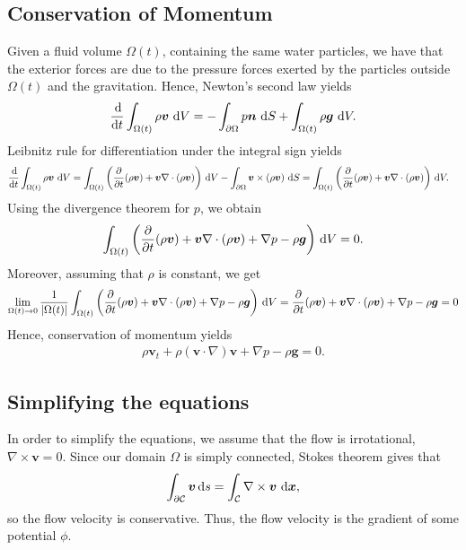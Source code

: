 \documentclass[11pt]{article}
\begin{document}
\subsection{Conservation of Momentum}
Given a fluid volume $\Omega(t)$, containing the same water particles, we have that the exterior forces are
due to the pressure forces exerted by the particles outside $\Omega(t)$ and the gravitation. Hence, Newton's second
law yields
\begin{align*}
    \frac{\operatorname{d}\! }{\operatorname{d}\! t}\int_{\Omega(t)}\rho \bm{v} \, \operatorname{d}\! V = -\int_{\partial \Omega} p \bm{n} \, \operatorname{d}\! S + \int_{\Omega(t)} \rho \bm{g} \, \operatorname{d}\! V.
\end{align*}
Leibnitz rule for differentiation under the integral sign yields
\begin{align*}
	\begin{aligned}
	    \frac{\operatorname{d}\!}{\operatorname{d}\! t} \int_{\Omega(t)} \rho \bm{v} \, \operatorname{d}\! V 
	        & = \int_{\Omega(t)} \bigg(\frac{\partial}{\partial t}(\rho \bm{v})
	                + \bm{v} \nabla \cdot (\rho \bm{v}) \bigg) \, \operatorname{d}\! V
	                - \int_{\partial \Omega} \bm{v} \times (\rho \bm{v}) \, \operatorname{d}\! S 
	         = \int_{\Omega(t)} \bigg(\frac{\partial}{\partial t}(\rho \bm{v})
	                + \bm{v} \nabla \cdot (\rho \bm{v}) \bigg) \, \operatorname{d}\! V.           
	\end{aligned}
\end{align*}
Using the divergence theorem for $p$, we obtain
\begin{align*}
    \int_{\Omega(t)} \bigg(\frac{\partial}{\partial t}(\rho \bm{v})
	                + \bm{v} \nabla \cdot (\rho \bm{v}) + \nabla p - \rho \bm{g} \bigg) \, \operatorname{d}\! V = 0.
\end{align*}
Moreover, assuming that $\rho$ is constant, we get
\begin{align*}
    \lim_{\Omega(t) \rightarrow 0} \frac{1}{|\Omega(t)|}\int_{\Omega(t)} \bigg(\frac{\partial}{\partial t}(\rho \bm{v})
	                + \bm{v} \nabla \cdot (\rho \bm{v}) + \nabla p - \rho \bm{g} \bigg) \, \operatorname{d}\! V 
	                = \frac{\partial}{\partial t}(\rho \bm{v})
	                + \bm{v} \nabla \cdot (\rho \bm{v}) + \nabla p - \rho \bm{g} = 0
\end{align*}
Hence, conservation of momentum yields
\begin{align}
    \label{eq:momentumConservation}
    \rho \bm{v}_t + \rho(\bm{v} \cdot \nabla) \bm{v} + \nabla p - \rho \bm{g} = 0.
\end{align}
%
%
\subsection{Simplifying the equations}
In order to simplify the equations, we assume that the flow is irrotational, $\nabla \times \bm{v} = 0$. Since
our domain $\Omega$ is simply connected, Stokes theorem gives that
\begin{align*}
	\int_{\partial \mathcal{C}} \bm{v} \operatorname{d}\! s = \int_{\mathcal{C}} \nabla \times \bm{v} \, \operatorname{d}\! \bm{x},
\end{align*}
so the flow velocity is conservative. Thus, the flow velocity is the gradient
of some potential $\phi$.
\end{document}
